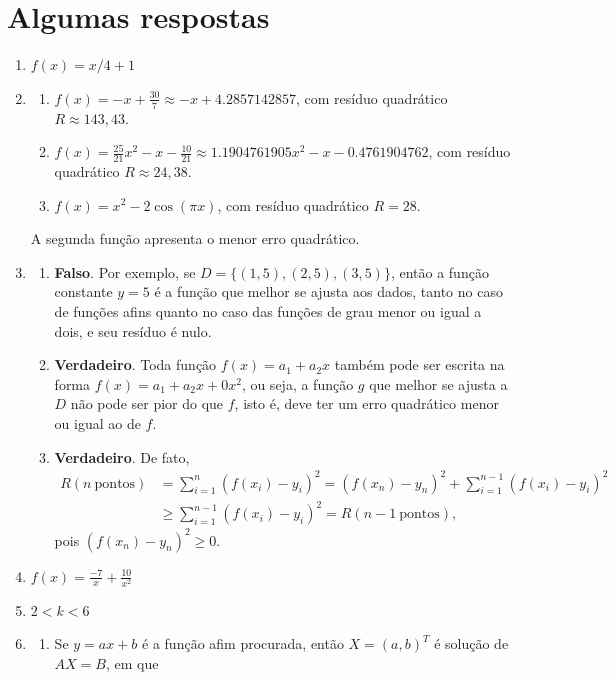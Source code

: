\documentclass[12pt,a4paper]{article}
\begin{document}
\newpage
\section*{Algumas respostas}

\begin{enumerate}
\item $f(x) = x/4 + 1$
\item \begin{enumerate}
\item $f(x) = -x + \frac{30}{7} \approx -x + 4.2857142857$, com resíduo quadrático $R \approx 143,43$.
\item $f(x) = \frac{25}{21}x^2 - x-\frac{10}{21} \approx 1.1904761905x^2 - x - 0.4761904762$, com resíduo quadrático $R \approx 24,38$.
\item $f(x) = x^2 - 2\cos(\pi x)$, com resíduo quadrático $R = 28$.
\end{enumerate}
A segunda função apresenta o menor erro quadrático.
\item
\begin{enumerate}
\item \textbf{Falso}. Por exemplo, se $D = \{(1,5), (2,5), (3,5)\}$, então a função constante $y = 5$ é a função que melhor se ajusta aos dados, tanto no caso de funções afins quanto no caso das funções de grau menor ou igual a dois, e seu resíduo é nulo.
\item \textbf{Verdadeiro}. Toda função $f(x) = a_1 + a_2 x$ também pode ser escrita na forma $f(x) = a_1 + a_2 x + 0 x^2$, ou seja, a função $g$ que melhor se ajusta a $D$ não pode ser pior do que $f$, isto é, deve ter um erro quadrático menor ou igual ao de $f$.
\item \textbf{Verdadeiro}. De fato,
\begin{align*}
R(n\ \text{pontos})
& = \sum_{i=1}^n (f(x_i)-y_i)^2
= (f(x_n)-y_n)^2 + \sum_{i=1}^{n-1} (f(x_i)-y_i)^2 \\
& \geq \sum_{i=1}^{n-1} (f(x_i)-y_i)^2
= R(n-1\ \text{pontos}),
\end{align*}
pois $(f(x_n)-y_n)^2 \geq 0$.
\end{enumerate}
\item $f(x) = \frac{-7}{x} + \frac{10}{x^2}$
\item $2 < k < 6$

\item \begin{enumerate}
   \item Se $y = a x + b$ é a função afim procurada, então $X = (a, b)^T$ é solução de $A X = B$, em que


\end{enumerate}
\end{enumerate}
\end{document}
